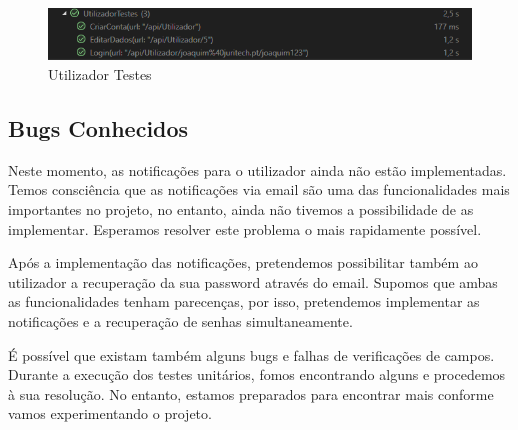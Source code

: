 \begin{figure}[!h]
\centering
\includegraphics[width=1\textwidth]{Figuras/Testes/UtilizadorTestes.png}
\caption{Utilizador Testes}
\label{d.teste}
\end{figure}

\newpage


\subsection{Bugs Conhecidos}
\indent \par Neste momento, as notificações para o utilizador ainda não estão implementadas. Temos consciência que as notificações via email são uma das funcionalidades mais importantes no projeto, no entanto, ainda não tivemos a possibilidade de as implementar. Esperamos resolver este problema o mais rapidamente possível.
\indent \par Após a implementação das notificações, pretendemos possibilitar também ao utilizador a recuperação da sua password através do email. Supomos que ambas as funcionalidades tenham parecenças, por isso, pretendemos implementar as notificações e a recuperação de senhas simultaneamente.
\indent \par É possível que existam também alguns bugs e falhas de verificações de campos.
Durante a execução dos testes unitários, fomos encontrando alguns e procedemos à sua resolução. No entanto, estamos preparados para encontrar mais conforme vamos experimentando o projeto.  
